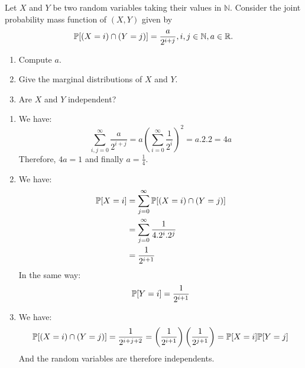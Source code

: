 
\begin{Exercise}
  Let $X$ and $Y$ be two random variables taking their values in $\mathbb{N}$. Consider the joint probability mass function of $(X, Y)$ given by
  \[
    \mathbb{P}[(X = i) \cap (Y = j)] = \frac{a}{2^{i+j}}, i, j \in \mathbb{N}, a \in \mathbb{R} .
  \]
  \begin{enumerate}
    \item Compute $a$.
    \item Give the marginal distributions of $X$ and $Y$.
    \item Are $X$ and $Y$ independent?
  \end{enumerate}
\end{Exercise}


\begin{solution}
  \begin{enumerate}
    \item We have:
          \[
            \sum_{i, j = 0}^\infty \frac{a}{2^{i+j}} = a {\left( \sum_{i =
                  0}^\infty \frac{1}{2^i} \right)}^2 = a.2.2 = 4a
          \]
          Therefore, $4a = 1$ and finally $a = \frac{1}{4}$.
    \item We have:
          \begin{align*}
            \mathbb{P}[X = i] & = \sum_{j = 0}^\infty \mathbb{P}[(X = i) \cap (Y = j)] \\
                          & = \sum_{j = 0}^\infty \frac{1}{4.2^i.2^j}          \\
                          & = \frac{1}{2^{i+1}}
          \end{align*}
          In the same way:
          \[ \mathbb{P}[Y = i] = \frac{1}{2^{i+1}} \]
    \item We have:
          \[
            \mathbb{P}[(X = i) \cap (Y = j)] = \frac{1}{2^{i+j+2}} =
            \left(\frac{1}{2^{i+1}} \right) \left(\frac{1}{2^{j+1}} \right) = \mathbb{P}[X = i]
            \mathbb{P}[Y = j]
          \]
          And the random variables are therefore independents.
  \end{enumerate}
\end{solution}


